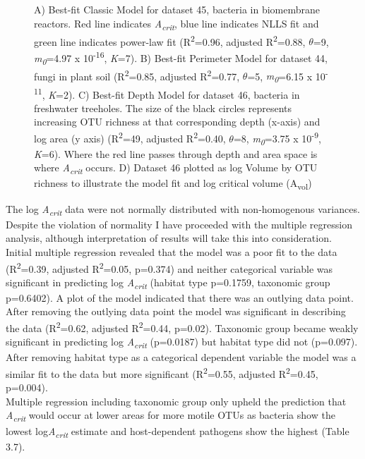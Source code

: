 {{\begin{figure}[htbp]
\caption{A) Best-fit Classic Model for dataset 45, bacteria in biomembrane reactors. Red line indicates \textit{A\textsubscript{crit}}, blue line indicates NLLS fit and green line indicates power-law fit (R\textsuperscript{2}=0.96, adjusted R\textsuperscript{2}=0.88, $\theta$=9, \textit{m\textsubscript{0}}=4.97 x 10\textsuperscript{-16}, \textit{K}=7). B) Best-fit Perimeter Model for dataset 44, fungi in plant soil (R\textsuperscript{2}=0.85, adjusted R\textsuperscript{2}=0.77, $\theta$=5, \textit{m\textsubscript{0}}=6.15 x 10\textsuperscript{-11}, \textit{K}=2). C) Best-fit Depth Model for dataset 46, bacteria in freshwater treeholes. The size of the black circles represents increasing OTU richness at that corresponding depth (x-axis) and log area (y axis) (R\textsuperscript{2}=49, adjusted R\textsuperscript{2}=0.40, $\theta$=8, \textit{m\textsubscript{0}}=3.75 x 10\textsuperscript{-9}, \textit{K}=6). Where the red line passes through depth and area space is where \textit{A\textsubscript{crit}} occurs. D) Dataset 46 plotted as log Volume by OTU richness to illustrate the model fit and log critical volume (A\textsubscript{vol})}
\label{fig:myfig}
\end{figure}

\noindent The log \textit{A\textsubscript{crit}} data were not normally distributed with non-homogenous variances. Despite the violation of normality I have proceeded with the multiple regression analysis, although interpretation of results will take this into consideration. \\

\noindent Initial multiple regression revealed that the model was a poor fit to the data (R\textsuperscript{2}=0.39, adjusted R\textsuperscript{2}=0.05, p=0.374) and neither categorical variable was significant in predicting log \textit{A\textsubscript{crit}} (habitat type p=0.1759, taxonomic group p=0.6402). A plot of the model indicated that there was an outlying data point. After removing the outlying data point the model was significant in describing the data (R\textsuperscript{2}=0.62, adjusted R\textsuperscript{2}=0.44, p=0.02). Taxonomic group became weakly significant in predicting log \textit{A\textsubscript{crit}} (p=0.0187) but habitat type did not (p=0.097). After removing habitat type as a categorical dependent variable the model was a similar fit to the data but more significant (R\textsuperscript{2}=0.55, adjusted R\textsuperscript{2}=0.45, p=0.004).\\

\noindent Multiple regression including taxonomic group only upheld the prediction that \textit{A\textsubscript{crit}} would occur at lower areas for more motile OTUs as bacteria show the lowest log\textit{A\textsubscript{crit}} estimate and host-dependent pathogens show the highest (Table 3.7). \\

}}
